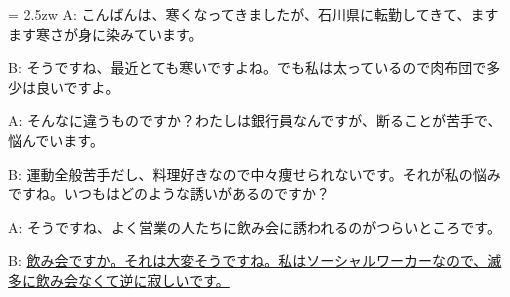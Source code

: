 \documentclass[11pt]{amsart}
\title{}
\author{}
\newenvironment{hangall}[1]{\hangindent = 2.5zw\everypar{\hangindent = 2.5zw}}{}
\begin{document}
\maketitle
\begin{hangall}{}%
A: こんばんは、寒くなってきましたが、石川県に転勤してきて、ますます寒さが身に染みています。

B: そうですね、最近とても寒いですよね。でも私は太っているので肉布団で多少は良いですよ。

A: そんなに違うものですか？わたしは銀行員なんですが、断ることが苦手で、悩んでいます。

B: 運動全般苦手だし、料理好きなので中々痩せられないです。それが私の悩みですね。いつもはどのような誘いがあるのですか？

A: そうですね、よく営業の人たちに飲み会に誘われるのがつらいところです。

B: \ul{飲み会ですか。それは大変そうですね。私はソーシャルワーカーなので、滅多に飲み会なくて逆に寂しいです。}\end{hangall}
\end{document}
